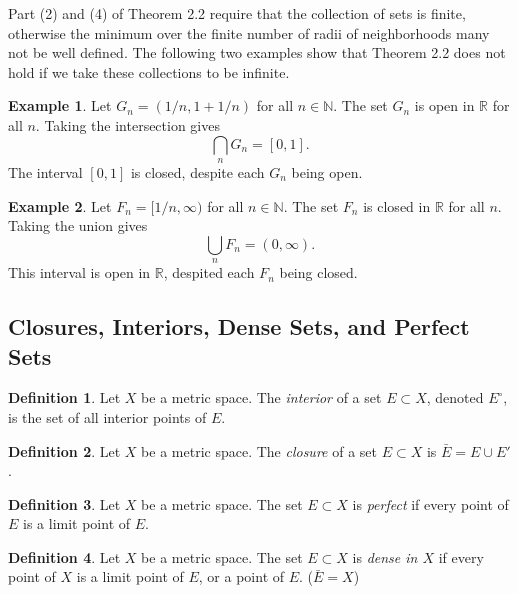 \documentclass{article}
\newcommand{\N}{\mathbb{N}}
\newcommand{\R}{\mathbb{R}}
\theoremstyle{definition}
\newtheorem{definition}{Definition}[section]
\newtheorem{example}{Example}[section]
\begin{document}
Part (2) and (4) of Theorem 2.2 require that the collection of sets is finite, otherwise the minimum over the finite number of radii of neighborhoods many not be well defined. The following two examples show that Theorem 2.2 does not hold if we take these collections to be infinite. 
\begin{example}
	Let $ G_n=(1/n,1+1/n) $ for all $ n\in\N $. The set $ G_n $ is open in $ \R $ for all $ n $. Taking the intersection gives $$\bigcap_n G_n=[0,1] .$$ The interval $ [0,1] $ is closed, despite each $ G_n $ being open.  
\end{example}
\begin{example}
	Let $ F_n=[1/n,\infty) $ for all $ n\in\N $. The set $ F_n $ is closed in $ \R $ for all $ n $. Taking the union gives $$ \bigcup_{n}F_n=(0,\infty).$$ This interval is open in $ \R $, despited each $ F_n $ being closed.
\end{example}
\subsection{Closures, Interiors, Dense Sets, and Perfect Sets} 
\begin{definition}
Let $ X $ be a metric space. The \textit{\color{red}interior} of a set $ E\subset X $, denoted $ E^\circ $, is the set of all interior points of $ E $. 
\end{definition}
\begin{definition}
	Let $ X $ be a metric space. The \textit{\color{red}closure} of a set $ E\subset X $ is $ \bar{E}=E\cup E' $. 
\end{definition}
\begin{definition}
	Let $ X $ be a metric space. The set $ E\subset X $ is \textit{\color{red}perfect} if every point of $ E $ is a limit point of $ E $. 
\end{definition}
\begin{definition}
	Let $ X $ be a metric space. The set $ E\subset X $ is \textit{\color{red}dense in $ X $} if every point of $ X $ is a limit point of $ E $, or a point of $ E $. ($ \bar{E}=X $)  
\end{definition}
\end{document}
